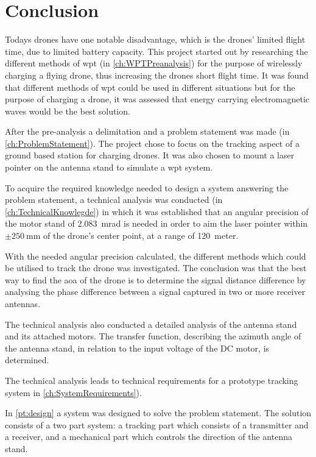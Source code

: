 \chapter{Conclusion}
Todays drones have one notable disadvantage, which is the drones' limited flight time, due to limited battery capacity. This project started out by researching the different methods of \gls{wpt} (in \autoref{ch:WPTPreanalysis}) for the purpose of wirelessly charging a flying drone, thus increasing the drones short flight time. It was found that different methods of \gls{wpt} could be used in different situations but for the purpose of charging a drone, it was assessed that energy carrying electromagnetic waves would be the best solution. 

After the pre-analysis a delimitation and a problem statement was made (in \autoref{ch:ProblemStatement}). The project chose to focus on the tracking aspect of a ground based station for charging drones. It was also chosen to mount a laser pointer on the antenna stand to simulate a \gls{wpt} system. 

To acquire the required knowledge needed to design a system answering the problem statement, a technical analysis was conducted (in \autoref{ch:TechnicalKnowlegde}) in which it was established that an angular precision of the motor stand of \SI{2,083}{\milli\radian} is needed in order to aim the laser pointer within $\pm \SI{250}{\milli\meter}$ of the drone's center point, at a range of \SI{120}{meter}. 

With the needed angular precision calculated, the different methods which could be utilised to track the drone was investigated. The conclusion was that the best way to find the \gls{aoa} of the drone is to determine the signal distance difference by analysing the phase difference between a signal captured in two or more receiver antennas.

The technical analysis also conducted a detailed analysis of the antenna stand and its attached motors. The transfer function, describing the azimuth angle of the antenna stand, in relation to the input voltage of the DC motor, is determined.

The technical analysis leads to technical requirements for a prototype tracking system in \autoref{ch:SystemRequirements}).

In \autoref{pt:design} a system was designed to solve the problem statement. The solution consists of a two part system: a tracking part which consists of a transmitter and a receiver, and a mechanical part which controls the direction of the antenna stand.

